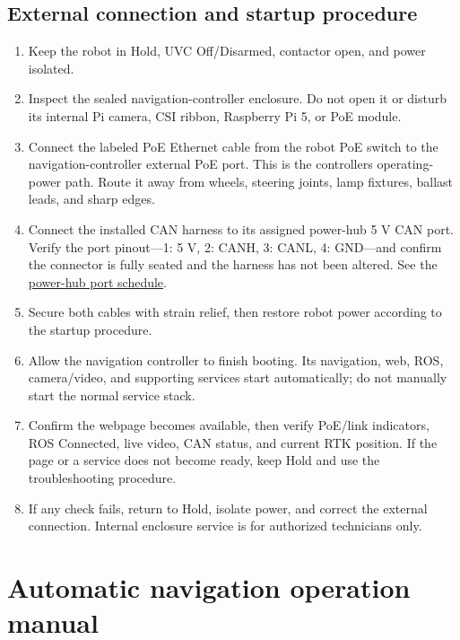 \documentclass[
  10pt,
  letterpaper,
  openany]{report}
\providecommand{\tightlist}{%
  \setlength{\itemsep}{0pt}\setlength{\parskip}{0pt}}
\begin{document}
\subsection{External connection and startup
procedure}\label{external-connection-and-startup-procedure}

\begin{enumerate}
\tightlist
\item
  Keep the robot in Hold, UVC Off/Disarmed, contactor open, and power
  isolated.
\item
  Inspect the sealed navigation-controller enclosure. Do not open it or
  disturb its internal Pi camera, CSI ribbon, Raspberry Pi 5, or PoE
  module.
\item
  Connect the labeled PoE Ethernet cable from the robot PoE switch to
  the navigation-controller external PoE port. This is the
  controller\textquotesingle s operating-power path. Route it away from
  wheels, steering joints, lamp fixtures, ballast leads, and sharp
  edges.
\item
  Connect the installed CAN harness to its assigned power-hub 5 V CAN
  port. Verify the port pinout---1: 5 V, 2: CANH, 3: CANL, 4: GND---and
  confirm the connector is fully seated and the harness has not been
  altered. See the \hyperref[power-hub-ports]{power-hub port schedule}.
\item
  Secure both cables with strain relief, then restore robot power
  according to the startup procedure.
\item
  Allow the navigation controller to finish booting. Its navigation,
  web, ROS, camera/video, and supporting services start automatically;
  do not manually start the normal service stack.
\item
  Confirm the webpage becomes available, then verify PoE/link
  indicators, ROS Connected, live video, CAN status, and current RTK
  position. If the page or a service does not become ready, keep Hold
  and use the troubleshooting procedure.
\item
  If any check fails, return to Hold, isolate power, and correct the
  external connection. Internal enclosure service is for authorized
  technicians only.
\end{enumerate}

\protect{}\label{nav-operation}
\section{Automatic navigation operation
manual}\label{automatic-navigation-operation-manual}
\end{document}
